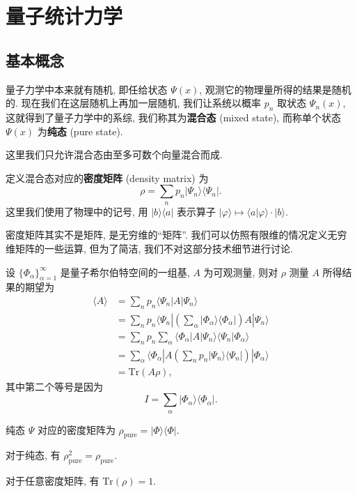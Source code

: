 \section{量子统计力学}
\subsection{基本概念}
量子力学中本来就有随机, 即任给状态 $ \Psi(x) $, 观测它的物理量所得的结果是随机的. 现在我们在这层随机上再加一层随机, 我们让系统以概率 $ p_n $ 取状态 $ \Psi_n(x) $, 这就得到了量子力学中的系综, 我们称其为{\bf 混合态} (mixed state), 而称单个状态 $ \Psi(x) $ 为{\bf 纯态} (pure state).
\begin{remark}
    这里我们只允许混合态由至多可数个向量混合而成.
\end{remark}
定义混合态对应的{\bf 密度矩阵} (density matrix) 为
\[ \rho=\sum_n p_n| \Psi_n \rangle\langle \Psi_n |. \]
这里我们使用了物理中的记号, 用 $ | b \rangle\langle a | $ 表示算子 $ | \varphi \rangle\mapsto\langle a|\varphi \rangle\cdot| b \rangle $.
\begin{remark}
    密度矩阵其实不是矩阵, 是无穷维的``矩阵''. 我们可以仿照有限维的情况定义无穷维矩阵的一些运算, 但为了简洁, 我们不对这部分技术细节进行讨论.
\end{remark}
设 $ \{\Phi_\alpha\}_{\alpha=1}^{\infty} $ 是量子希尔伯特空间的一组基, $ A $ 为可观测量, 则对 $ \rho $ 测量 $ A $ 所得结果的期望为
\begin{align*}
    \langle A\rangle &=\sum_n p_n\langle \Psi_n |A| \Psi_n \rangle\\ 
    &=\sum_n p_n\langle \Psi_n |\left( \sum_\alpha| \Phi_\alpha \rangle\langle \Phi_\alpha | \right)A| \Psi_n \rangle\\ 
    &=\sum_n p_n\sum_\alpha\langle \Phi_\alpha | A| \Psi_n \rangle\langle \Psi_n |\Phi_\alpha\rangle\\ 
    &=\sum_\alpha \langle \Phi_\alpha | A\left( \sum_n p_n| \Psi_n \rangle\langle \Psi_n | \right)| \Phi_\alpha \rangle\\ 
    &= \mathrm{Tr}(A\rho),
\end{align*}
其中第二个等号是因为
\[ I=\sum_\alpha| \Phi_\alpha \rangle\langle \Phi_\alpha |. \]
\begin{example}
    纯态 $ \Psi $ 对应的密度矩阵为 $ \rho_{\mathrm{pure}}=| \Phi \rangle\langle \Phi | $.
\end{example}
\begin{proposition}
    对于纯态, 有 $ \rho_{\mathrm{pure}}^2=\rho_{\mathrm{pure}} $.
\end{proposition}
\begin{proposition}
    对于任意密度矩阵, 有 $ \mathrm{Tr}(\rho)=1 $.
\end{proposition}

